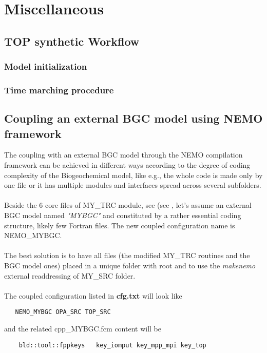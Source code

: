 \documentclass[../main/TOP_manual]{subfiles}
\begin{document}
\chapter{Miscellaneous}

\section{TOP synthetic Workflow}

\subsection{Model initialization}

\subsection{Time marching procedure}

\section{Coupling an external BGC model using NEMO framework}

The coupling with an external BGC model through the NEMO compilation framework can be achieved in different ways according to the degree of coding complexity of the Biogeochemical model, like e.g., the whole code is made only by one file or it has multiple modules and interfaces spread across several subfolders.\\ \\
Beside the 6 core files of MY\_TRC module, see (see \label{Mytrc}, let's assume an external BGC model named \textit{"MYBGC"} and constituted by a rather essential coding structure, likely few Fortran files. The new coupled configuration name is NEMO\_MYBGC. \\ \\
The best solution is to have all files (the modified MY\_TRC routines and the BGC model ones) placed in a unique folder with root  and to use the \textit{makenemo} external readdressing of MY\_SRC folder. \\ \\
The coupled configuration listed in \textbf{cfg.txt}  will look like

\begin{verbatim}
   NEMO_MYBGC OPA_SRC TOP_SRC
\end{verbatim}
and the related cpp\_MYBGC.fcm content will be
%
\begin{verbatim}
    bld::tool::fppkeys   key_iomput key_mpp_mpi key_top
\end{verbatim}
\end{document}
